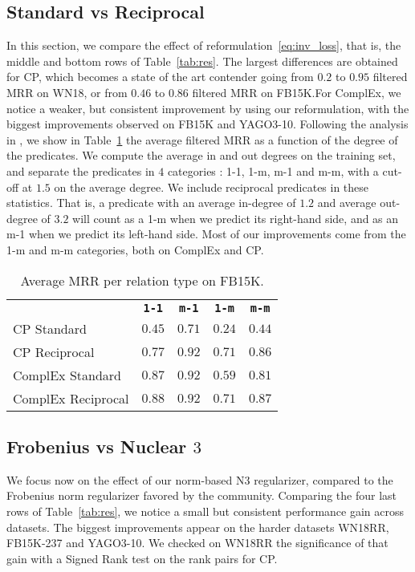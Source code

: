 \documentclass{article}
\newcommand{\CP}{{CP}\xspace}
\newcommand{\complex}{{ComplEx}\xspace}
\newcommand{\fb}{{FB15K}\xspace}
\newcommand{\fbd}{{FB15K-237}\xspace}
\newcommand{\wn}{{WN18}\xspace}
\newcommand{\wnrr}{{WN18RR}\xspace}
\newcommand{\yago}{{YAGO3-10}\xspace}
\begin{document}
\subsection{Standard vs Reciprocal}
In this section, we compare the effect of reformulation~\eqref{eq:inv_loss}, that is, the middle and bottom rows of Table~\ref{tab:res}. The largest differences are obtained for \CP, which becomes a state of the art contender going from $0.2$ to $0.95$ filtered MRR on \wn, or from $0.46$ to $0.86$ filtered MRR on \fb.For \complex, we notice a weaker, but consistent improvement by using our reformulation, with the biggest improvements observed on \fb and \yago. 
Following the analysis in \citet{bordes_translating_2013}, we show in Table~\ref{tab:mrr_stats} the average filtered MRR as a function of the degree of the predicates. We compute the average in and out degrees on the training set, and separate the predicates in $4$ categories : 1-1, 1-m, m-1 and m-m, with a cut-off at $1.5$ on the average degree. We include reciprocal predicates in these statistics. That is, a predicate with an average in-degree of $1.2$ and average out-degree of $3.2$ will count as a 1-m when we predict its right-hand side, and as an m-1 when we predict its left-hand side. Most of our improvements come from the 1-m and m-m categories, both on \complex and \CP.
\begin{table}[t]
\centering
\begin{tabular}{lcccc}
\toprule
{} & \bf{\texttt{1-1}} & \bf{\texttt{m-1}} & \bf{\texttt{1-m}} & \bf{\texttt{m-m}} \\
\CP Standard          & $0.45$ & $0.71$ & $0.24$ & $0.44$\\
\CP Reciprocal        & $0.77$ & $\bm{0.92}$ & $\bm{0.71}$ & $0.86$\\
\complex Standard     & $0.87$ & $\bm{0.92}$ & $0.59$ & $0.81$ \\
\complex Reciprocal & $\bm{0.88}$ & $\bm{0.92}$ & $\bm{0.71}$ & $\bm{0.87}$\\
\bottomrule
\end{tabular}
\caption{Average MRR per relation type on \fb.}
\label{tab:mrr_stats}
\end{table}

\subsection{Frobenius vs Nuclear $3$}
We focus now on the effect of our norm-based N3 regularizer, compared to the Frobenius norm regularizer favored by the community. Comparing the four last rows of Table~\ref{tab:res}, we notice a small but consistent performance gain across datasets. The biggest improvements appear on the harder datasets \wnrr, \fbd and \yago. We checked on \wnrr the significance of that gain with a Signed Rank test on the rank pairs for \CP.
\end{document}
